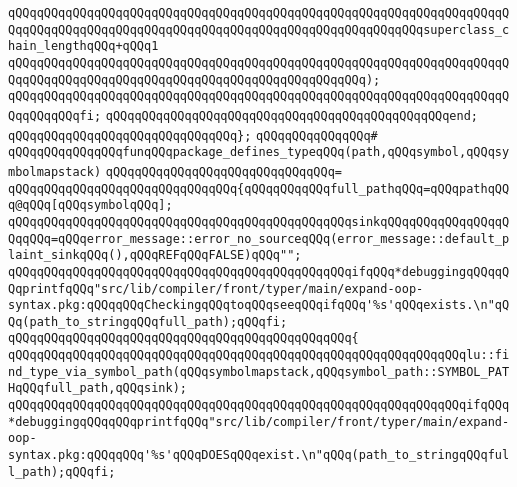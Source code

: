 \verb|qQQqqQQqqQQqqQQqqQQqqQQqqQQqqQQqqQQqqQQqqQQqqQQqqQQqqQQqqQQqqQQqqQQqqQQqqQQqqQQqqQQqqQQqqQQqqQQqqQQqqQQqqQQqqQQqqQQqqQQqqQQqqQQqsuperclass_chain_lengthqQQq+qQQq1|\newline
\verb|qQQqqQQqqQQqqQQqqQQqqQQqqQQqqQQqqQQqqQQqqQQqqQQqqQQqqQQqqQQqqQQqqQQqqQQqqQQqqQQqqQQqqQQqqQQqqQQqqQQqqQQqqQQqqQQqqQQqqQQq);|\newline
\verb|qQQqqQQqqQQqqQQqqQQqqQQqqQQqqQQqqQQqqQQqqQQqqQQqqQQqqQQqqQQqqQQqqQQqqQQqqQQqqQQqfi;|\newline
\verb|qQQqqQQqqQQqqQQqqQQqqQQqqQQqqQQqqQQqqQQqqQQqqQQqend;|\newline
\verb|qQQqqQQqqQQqqQQqqQQqqQQqqQQqqQQq};|\newline
\newline
\verb|qQQqqQQqqQQqqQQq#|\newline
\verb|qQQqqQQqqQQqqQQqfunqQQqpackage_defines_typeqQQq(path,qQQqsymbol,qQQqsymbolmapstack)|\newline
\verb|qQQqqQQqqQQqqQQqqQQqqQQqqQQqqQQq=|\newline
\verb|qQQqqQQqqQQqqQQqqQQqqQQqqQQqqQQq{qQQqqQQqqQQqfull_pathqQQq=qQQqpathqQQq@qQQq[qQQqsymbolqQQq];|\newline
\newline
\verb|qQQqqQQqqQQqqQQqqQQqqQQqqQQqqQQqqQQqqQQqqQQqqQQqsinkqQQqqQQqqQQqqQQqqQQqqQQq=qQQqerror_message::error_no_sourceqQQq(error_message::default_plaint_sinkqQQq(),qQQqREFqQQqFALSE)qQQq"";|\newline
\newline
\verb|qQQqqQQqqQQqqQQqqQQqqQQqqQQqqQQqqQQqqQQqqQQqqQQqifqQQq*debuggingqQQqqQQqprintfqQQq"src/lib/compiler/front/typer/main/expand-oop-syntax.pkg:qQQqqQQqCheckingqQQqtoqQQqseeqQQqifqQQq'%s'qQQqexists.\n"qQQq(path_to_stringqQQqfull_path);qQQqfi;|\newline
\newline
\verb|qQQqqQQqqQQqqQQqqQQqqQQqqQQqqQQqqQQqqQQqqQQqqQQq{|\newline
\verb|qQQqqQQqqQQqqQQqqQQqqQQqqQQqqQQqqQQqqQQqqQQqqQQqqQQqqQQqqQQqqQQqlu::find_type_via_symbol_path(qQQqsymbolmapstack,qQQqsymbol_path::SYMBOL_PATHqQQqfull_path,qQQqsink);|\newline
\newline
\verb|qQQqqQQqqQQqqQQqqQQqqQQqqQQqqQQqqQQqqQQqqQQqqQQqqQQqqQQqqQQqqQQqifqQQq*debuggingqQQqqQQqprintfqQQq"src/lib/compiler/front/typer/main/expand-oop-syntax.pkg:qQQqqQQq'%s'qQQqDOESqQQqexist.\n"qQQq(path_to_stringqQQqfull_path);qQQqfi;|\newline
\newline
